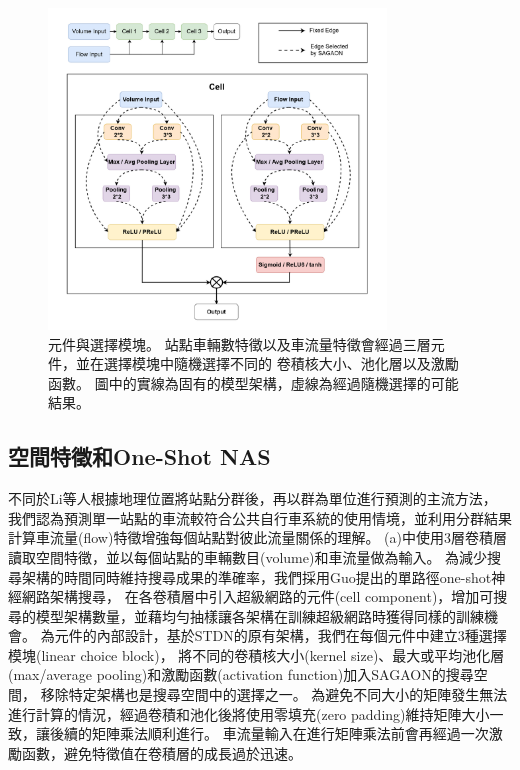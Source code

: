 \documentclass[a4paper,12pt]{extarticle}
\begin{document}
        \begin{figure}[htb]
            \centering
            \includegraphics[width=0.8\textwidth]{cell.pdf}
            \caption{
                元件與選擇模塊。
                站點車輛數特徵以及車流量特徵會經過三層元件，並在選擇模塊中隨機選擇不同的
                卷積核大小、池化層以及激勵函數。
                圖中的實線為固有的模型架構，虛線為經過隨機選擇的可能結果。
            }
            \label{fig:cell}
        \end{figure}
        
        \subsection{空間特徵和One-Shot NAS}
            \label{subsec:spatial_temporal}
            
            不同於Li等人\cite{li2015traffic}根據地理位置將站點分群後，再以群為單位進行預測的主流方法，
            我們認為預測單一站點的車流較符合公共自行車系統的使用情境，並利用分群結果計算車流量(flow)特徵增強每個站點對彼此流量關係的理解。
            (a)中使用3層卷積層讀取空間特徵，並以每個站點的車輛數目(volume)和車流量做為輸入。
            為減少搜尋架構的時間同時維持搜尋成果的準確率，我們採用Guo\cite{guo2020single}提出的單路徑one-shot神經網路架構搜尋，
            在各卷積層中引入超級網路的元件(cell component)，增加可搜尋的模型架構數量，並藉均勻抽樣讓各架構在訓練超級網路時獲得同樣的訓練機會。
            為元件的內部設計，基於STDN的原有架構，我們在每個元件中建立3種選擇模塊(linear choice block)，
            將不同的卷積核大小(kernel size)、最大或平均池化層(max/average pooling)和激勵函數(activation function)加入SAGAON的搜尋空間，
            移除特定架構也是搜尋空間中的選擇之一。
            為避免不同大小的矩陣發生無法進行計算的情況，經過卷積和池化後將使用零填充(zero padding)維持矩陣大小一致，讓後續的矩陣乘法順利進行。
            車流量輸入在進行矩陣乘法前會再經過一次激勵函數，避免特徵值在卷積層的成長過於迅速。
\end{document}
